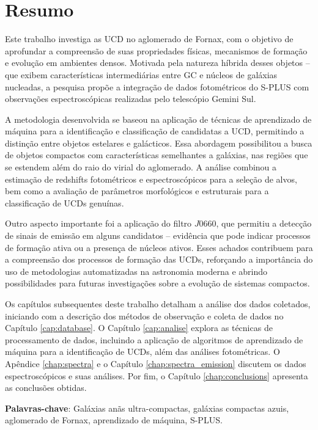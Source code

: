 \thispagestyle{empty}
\chapter*{Resumo}
Este trabalho investiga as \ac{UCD} no aglomerado de Fornax, com o objetivo de aprofundar a compreensão de suas propriedades físicas, mecanismos de formação e evolução em ambientes densos. Motivada pela natureza híbrida desses objetos – que exibem características intermediárias entre \ac{GC} e núcleos de galáxias nucleadas, a pesquisa propõe a integração de dados fotométricos do S-PLUS com observações espectroscópicas realizadas pelo telescópio Gemini Sul.

A metodologia desenvolvida se baseou na aplicação de técnicas de aprendizado de máquina para a identificação e classificação de candidatas a \ac{UCD}, permitindo a distinção entre objetos estelares e galácticos. Essa abordagem possibilitou a busca de objetos compactos com características semelhantes a galáxias, nas regiões que se estendem além do raio do virial do aglomerado. A análise combinou a estimação de redshifts fotométricos e espectroscópicos para a seleção de alvos, bem como a avaliação de parâmetros morfológicos e estruturais para a classificação de UCDs genuínas.

Outro aspecto importante foi a aplicação do filtro $J0660$, que permitiu a detecção de sinais de emissão em alguns candidatos – evidência que pode indicar processos de formação ativa ou a presença de núcleos ativos. Esses achados contribuem para a compreensão dos processos de formação das UCDs, reforçando a importância do uso de metodologias automatizadas na astronomia moderna e abrindo possibilidades para futuras investigações sobre a evolução de sistemas compactos.

Os capítulos subsequentes deste trabalho detalham a análise dos dados coletados, iniciando com a descrição dos métodos de observação e coleta de dados no Capítulo \ref{cap:database}. O Capítulo \ref{cap:analise} explora as técnicas de processamento de dados, incluindo a aplicação de algoritmos de aprendizado de máquina para a identificação de UCDs, além das análises fotométricas. O Apêndice \ref{chap:spectra} e o Capítulo \ref{chap:spectra_emission} discutem os dados espectroscópicos e suas análises. Por fim, o Capítulo \ref{chap:conclusions} apresenta as conclusões obtidas.


\textbf{Palavras-chave}: Galáxias anãs ultra-compactas, galáxias compactas azuis, aglomerado de Fornax, aprendizado de máquina, S-PLUS.

